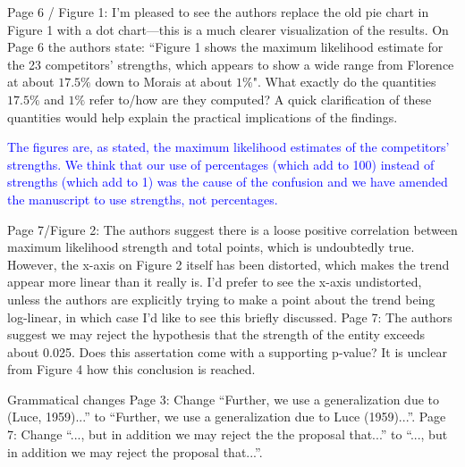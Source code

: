 \documentclass[12pt]{article}
\begin{document}
Page 6 / Figure 1: I'm pleased to see the authors replace the old pie
chart in Figure 1 with a dot chart---this is a much clearer
visualization of the results.  On Page 6 the authors state: ``Figure 1
shows the maximum likelihood estimate for the 23 competitors'
strengths, which appears to show a wide range from Florence at about
$17.5\%$ down to Morais at about $1\%$". What exactly do the
quantities $17.5\%$ and $1\%$ refer to/how are they computed? A quick
clarification of these quantities would help explain the practical
implications of the findings.

\textcolor{blue}{The figures are, as stated, the maximum likelihood
  estimates of the competitors' strengths.  We think that our use of
  percentages (which add to 100) instead of strengths (which add to 1)
  was the cause of the confusion and we have amended the manuscript to
  use strengths, not percentages.}

Page 7/Figure 2: The authors suggest there is a loose positive correlation between maximum likelihood
strength and total points, which is undoubtedly true. However, the x-axis on Figure 2 itself has been
distorted, which makes the trend appear more linear than it really is. I’d prefer to see the x-axis
undistorted, unless the authors are explicitly trying to make a point about the trend being log-linear,
in which case I’d like to see this briefly discussed.
Page 7: The authors suggest we may reject the hypothesis that the strength of the entity exceeds
about 0.025. Does this assertation come with a supporting p-value? It is unclear from Figure 4 how
this conclusion is reached.

Grammatical changes
Page 3: Change “Further, we use a generalization due to (Luce, 1959)...” to “Further, we use a
generalization due to Luce (1959)...”.
Page 7: Change “..., but in addition we may reject the the proposal that...” to “..., but in addition we
may reject the proposal that...”.
\end{document}
